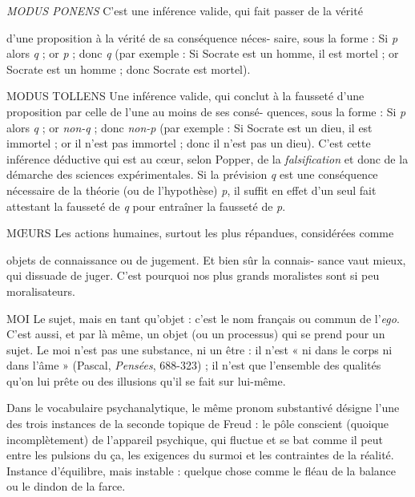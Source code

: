 {\it MODUS PONENS} C'est une inférence valide, qui fait passer de la vérité

d’une proposition à la vérité de sa conséquence néces-
saire, sous la forme : Si {\it p} alors {\it q} ; or {\it p} ; donc {\it q} (par exemple : Si Socrate est un
homme, il est mortel ; or Socrate est un homme ; donc Socrate est mortel).

MODUS TOLLENS Une inférence valide, qui conclut à la fausseté d’une
proposition par celle de l’une au moins de ses consé-
quences, sous la forme : Si {\it p} alors {\it q} ; or {\it non-q} ; donc {\it non-p} (par exemple : Si
Socrate est un dieu, il est immortel ; or il n’est pas immortel ; donc il n’est
pas un dieu). C’est cette inférence déductive qui est au cœur, selon Popper,
de la {\it falsification} et donc de la démarche des sciences expérimentales. Si la
prévision {\it q} est une conséquence nécessaire de la théorie (ou de l’hypothèse)
{\it p}, il suffit en effet d’un seul fait attestant la fausseté de {\it q} pour entraîner la
fausseté de {\it p}.

MŒURS Les actions humaines, surtout les plus répandues, considérées comme

objets de connaissance ou de jugement. Et bien sûr la connais-
sance vaut mieux, qui dissuade de juger. C’est pourquoi nos plus grands moralistes
sont si peu moralisateurs.

MOI Le sujet, mais en tant qu’objet : c’est le nom français ou commun de
l'{\it ego}. C’est aussi, et par là même, un objet (ou un processus) qui se
prend pour un sujet. Le moi n’est pas une substance, ni un être : il n’est « ni
dans le corps ni dans l’âme » (Pascal, {\it Pensées}, 688-323) ; il n’est que l’ensemble
des qualités qu’on lui prête ou des illusions qu’il se fait sur lui-même.

Dans le vocabulaire psychanalytique, le même pronom substantivé désigne
l’une des trois instances de la seconde topique de Freud : le pôle conscient
(quoique incomplètement) de l’appareil psychique, qui fluctue et se bat comme
il peut entre les pulsions du ça, les exigences du surmoi et les contraintes de la
réalité. Instance d'équilibre, mais instable : quelque chose comme le fléau de la
balance ou le dindon de la farce.

